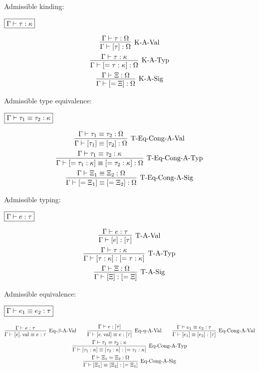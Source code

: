 Admissible kinding:

$\fbox{$\Gamma \vdash \tau: \kappa$}$

\begin{gather*}
  \infer[\text{K-A-Val}]{\Gamma \vdash [\tau]: \Omega}{
    \Gamma \vdash \tau: \Omega
  }
  \\
  \infer[\text{K-A-Typ}]{\Gamma \vdash [= \tau: \kappa]: \Omega}{
    \Gamma \vdash \tau: \kappa
  }
  \\
  \infer[\text{K-A-Sig}]{\Gamma \vdash [= \Xi]: \Omega}{
    \Gamma \vdash \Xi: \Omega
  }
\end{gather*}

Admissible type equivalence:

$\fbox{$\Gamma \vdash \tau_1 \equiv \tau_2: \kappa$}$

\begin{gather*}
  \infer[\text{T-Eq-Cong-A-Val}]{\Gamma \vdash [\tau_1] \equiv [\tau_2]: \Omega}{
    \Gamma \vdash \tau_1 \equiv \tau_2: \Omega
  }
  \\
  \infer[\text{T-Eq-Cong-A-Typ}]{\Gamma \vdash [= \tau_1: \kappa] \equiv [= \tau_2: \kappa]: \Omega}{
    \Gamma \vdash \tau_1 \equiv \tau_2: \kappa
  }
  \\
  \infer[\text{T-Eq-Cong-A-Sig}]{\Gamma \vdash [= \Xi_1] \equiv [= \Xi_2]: \Omega}{
    \Gamma \vdash \Xi_1 \equiv \Xi_2: \Omega
  }
\end{gather*}

Admissible typing:

$\fbox{$\Gamma \vdash e: \tau$}$

\begin{gather*}
  \infer[\text{T-A-Val}]{\Gamma \vdash [e]: [\tau]}{
    \Gamma \vdash e: \tau
  }
  \\
  \infer[\text{T-A-Typ}]{\Gamma \vdash [\tau: \kappa]: [= \tau: \kappa]}{
    \Gamma \vdash \tau: \kappa
  }
  \\
  \infer[\text{T-A-Sig}]{\Gamma \vdash [\Xi]: [= \Xi]}{
    \Gamma \vdash \Xi: \Omega
  }
\end{gather*}

Admissible equivalence:

$\fbox{$\Gamma \vdash e_1 \equiv e_2: \tau$}$

\begin{gather*}
  \infer[\text{Eq-$\beta$-A-Val}]{\Gamma \vdash [e].\symval \equiv e: \tau}{
    \Gamma \vdash e: \tau
  }
  \hspace{2em}
  \infer[\text{Eq-$\eta$-A-Val}]{\Gamma \vdash [e.\symval] \equiv e: [\tau]}{
    \Gamma \vdash e: [\tau]
  }
  \hspace{2em}
  \infer[\text{Eq-Cong-A-Val}]{\Gamma \vdash [e_1] \equiv [e_2]: [\tau]}{
    \Gamma \vdash e_1 \equiv e_2: \tau
  }
  \\
  \infer[\text{Eq-Cong-A-Typ}]{\Gamma \vdash [\tau_1: \kappa] \equiv [\tau_2: \kappa]: [= \tau_1: \kappa]}{
    \Gamma \vdash \tau_1 \equiv \tau_2: \kappa
  }
  \\
  \infer[\text{Eq-Cong-A-Sig}]{\Gamma \vdash [\Xi_1] \equiv [\Xi_2]: [= \Xi_1]}{
    \Gamma \vdash \Xi_1 \equiv \Xi_2: \Omega
  }
\end{gather*}

